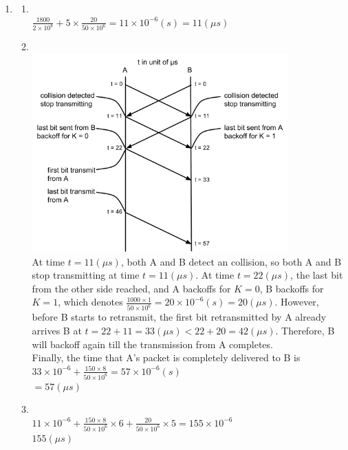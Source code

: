 \documentclass[10pt, a4paper]{article}
\begin{document}
\begin{enumerate}
\item\mbox{}
    \begin{enumerate}
    \item\mbox{}\\
        $\frac{1800}{2 \times 10^8} + 5 \times \frac{20}{50 \times 10^6} = 11 \times 10^{-6} (s) = 11 (\mu s)$
    \item\mbox{}\\
        \includegraphics[height=3in]{images/problem_4b}\\
        At time $t = 11 (\mu s)$, both A and B detect an collision, so both A and B stop transmitting at time $t = 11 (\mu s)$. At time $t = 22 (\mu s)$, the last bit from the other side reached, and A backoffs for $K = 0$, B backoffs for $K = 1$, which denotes $\frac{1000 \times 1}{50 \times 10^6} = 20 \times 10^{-6} (s) = 20 (\mu s)$. However, before B starts to retransmit, the first bit retransmitted by A already arrives B at $t = 22 + 11 = 33 (\mu s) < 22 + 20 = 42 (\mu s)$. Therefore, B will backoff again till the transmission from A completes.\\
        Finally, the time that A's packet is completely delivered to B is\\
        $33 \times 10^{-6} + \frac{150 \times 8}{50 \times 10^6} = 57 \times 10^{-6} (s)$\\
        $= 57 (\mu s)$
    \item\mbox{}\\
        $11 \times 10^{-6} + \frac{150 \times 8}{50 \times 10^6} \times 6 + \frac{20}{50 \times 10^6} \times 5 = 155 \times 10^{-6}$\\
        $155 (\mu s)$
    \end{enumerate}


\end{enumerate}
\end{document}
